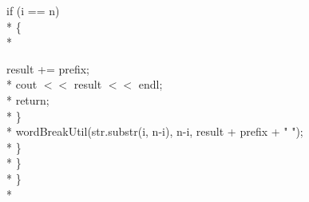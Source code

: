 \documentclass[12pt]{book}
\begin{document}
\phantom{x} \hspace{3ex} \phantom{x} \hspace{3ex} \phantom{x} \hspace{3ex}          if (i == n)\\*
\phantom{x} \hspace{3ex} \phantom{x} \hspace{3ex} \phantom{x} \hspace{3ex}          \{\\*
                
\phantom{x} \hspace{3ex} \phantom{x} \hspace{3ex} \phantom{x} \hspace{3ex} \phantom{x} \hspace{3ex}             result += prefix;\\*
\phantom{x} \hspace{3ex} \phantom{x} \hspace{3ex} \phantom{x} \hspace{3ex} \phantom{x} \hspace{3ex}             cout $<<$ result $<<$ endl;\\*
\phantom{x} \hspace{3ex} \phantom{x} \hspace{3ex} \phantom{x} \hspace{3ex} \phantom{x} \hspace{3ex}             return;\\*
\phantom{x} \hspace{3ex} \phantom{x} \hspace{3ex} \phantom{x} \hspace{3ex}          \}\\*
\phantom{x} \hspace{3ex} \phantom{x} \hspace{3ex} \phantom{x} \hspace{3ex}          wordBreakUtil(str.substr(i, n-i), n-i,
                                result + prefix + " ");\\*
\phantom{x} \hspace{3ex} \phantom{x} \hspace{3ex}       \}\\*
\phantom{x} \hspace{3ex}    \} \\*   
\}\\*
\end{document}
